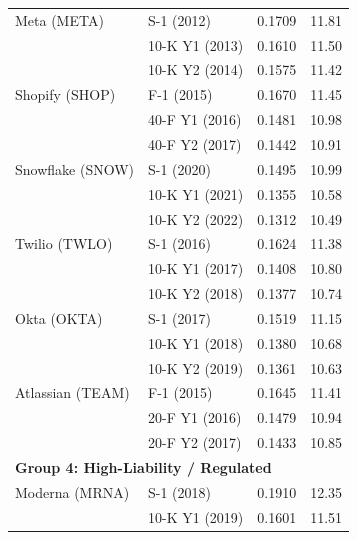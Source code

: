 \documentclass[12pt, letterpaper]{article}
\begin{document}
\begin{table}
\begin{tabular}{@{}llrr@{}}
        \addlinespace
        Meta (META)         & S-1 (2012)                   & 0.1709 & 11.81 \\
                            & 10-K Y1 (2013)               & 0.1610 & 11.50 \\
                            & 10-K Y2 (2014)               & 0.1575 & 11.42 \\
        \addlinespace
        Shopify (SHOP)      & F-1 (2015)                   & 0.1670 & 11.45 \\
                            & 40-F Y1 (2016)               & 0.1481 & 10.98 \\
                            & 40-F Y2 (2017)               & 0.1442 & 10.91 \\
        \addlinespace
        Snowflake (SNOW)    & S-1 (2020)                   & 0.1495 & 10.99 \\
                            & 10-K Y1 (2021)               & 0.1355 & 10.58 \\
                            & 10-K Y2 (2022)               & 0.1312 & 10.49 \\
        \addlinespace
        Twilio (TWLO)       & S-1 (2016)                   & 0.1624 & 11.38 \\
                            & 10-K Y1 (2017)               & 0.1408 & 10.80 \\
                            & 10-K Y2 (2018)               & 0.1377 & 10.74 \\
        \addlinespace
        Okta (OKTA)         & S-1 (2017)                   & 0.1519 & 11.15 \\
                            & 10-K Y1 (2018)               & 0.1380 & 10.68 \\
                            & 10-K Y2 (2019)               & 0.1361 & 10.63 \\
        \addlinespace
        Atlassian (TEAM)    & F-1 (2015)                   & 0.1645 & 11.41 \\
                            & 20-F Y1 (2016)               & 0.1479 & 10.94 \\
                            & 20-F Y2 (2017)               & 0.1433 & 10.85 \\
        \midrule
        \multicolumn{4}{l}{\textbf{Group 4: High-Liability / Regulated}} \\
        \addlinespace
        Moderna (MRNA)      & S-1 (2018)                   & 0.1910 & 12.35 \\
                            & 10-K Y1 (2019)               & 0.1601 & 11.51 \\

\end{tabular}
\end{table}
\end{document}
